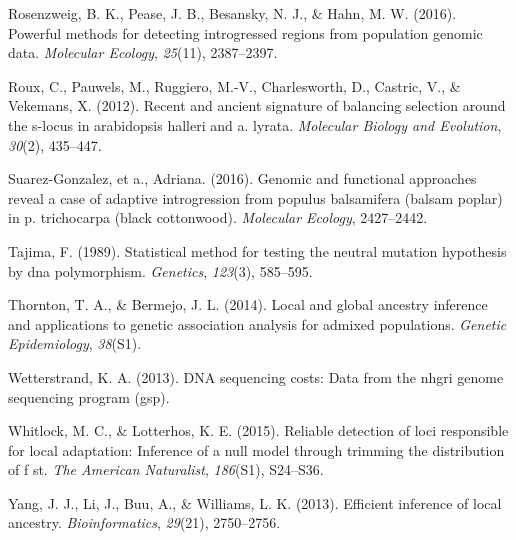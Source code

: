 \documentclass[12pt,a4paper,twoside]{ugathesis}
\theoremstyle{definition}
\theoremstyle{definition}
\theoremstyle{remark}
\begin{document}
\hypertarget{ref-rosenzweig2016powerful}{}
Rosenzweig, B. K., Pease, J. B., Besansky, N. J., \& Hahn, M. W. (2016).
Powerful methods for detecting introgressed regions from population
genomic data. \emph{Molecular Ecology}, \emph{25}(11), 2387--2397.

\hypertarget{ref-roux2012recent}{}
Roux, C., Pauwels, M., Ruggiero, M.-V., Charlesworth, D., Castric, V.,
\& Vekemans, X. (2012). Recent and ancient signature of balancing
selection around the s-locus in arabidopsis halleri and a. lyrata.
\emph{Molecular Biology and Evolution}, \emph{30}(2), 435--447.

\hypertarget{ref-suarez2016}{}
Suarez-Gonzalez, et a., Adriana. (2016). Genomic and functional
approaches reveal a case of adaptive introgression from populus
balsamifera (balsam poplar) in p. trichocarpa (black cottonwood).
\emph{Molecular Ecology}, 2427--2442.

\hypertarget{ref-tajima1989statistical}{}
Tajima, F. (1989). Statistical method for testing the neutral mutation
hypothesis by dna polymorphism. \emph{Genetics}, \emph{123}(3),
585--595.

\hypertarget{ref-thornton2014local}{}
Thornton, T. A., \& Bermejo, J. L. (2014). Local and global ancestry
inference and applications to genetic association analysis for admixed
populations. \emph{Genetic Epidemiology}, \emph{38}(S1).

\hypertarget{ref-wetterstrand2013dna}{}
Wetterstrand, K. A. (2013). DNA sequencing costs: Data from the nhgri
genome sequencing program (gsp).

\hypertarget{ref-whitlock2015reliable}{}
Whitlock, M. C., \& Lotterhos, K. E. (2015). Reliable detection of loci
responsible for local adaptation: Inference of a null model through
trimming the distribution of f st. \emph{The American Naturalist},
\emph{186}(S1), S24--S36.

\hypertarget{ref-yang2013efficient}{}
Yang, J. J., Li, J., Buu, A., \& Williams, L. K. (2013). Efficient
inference of local ancestry. \emph{Bioinformatics}, \emph{29}(21),
2750--2756.


\end{document}
